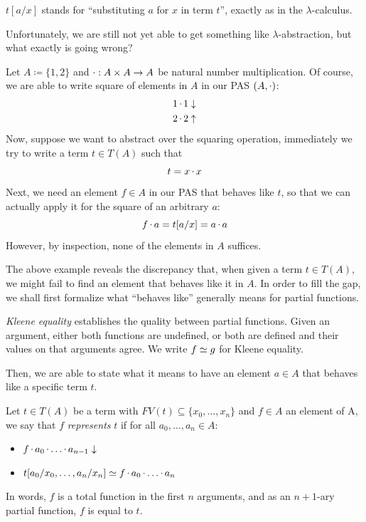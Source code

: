 \begin{notation}
    \(t[a/x]\) stands for ``substituting \(a\) for \(x\) in term \(t\)'', exactly as in the \(\lambda\)-calculus.
\end{notation}

Unfortunately, we are still not yet able to get something like \(\lambda\)-abstraction, but what exactly is going wrong?

\begin{example}
    Let \(A \coloneq \{1, 2\}\) and \(\mathop\cdot\nolimits : A \times A \rightarrow A\) be natural number multiplication.  Of course, we are able to write square of elements in \(A\) in our PAS \((A, \mathop\cdot\nolimits)\):
    \begin{align*}
        1 \mathop\cdot\nolimits 1 \downarrow \\
        2 \mathop\cdot\nolimits 2 \uparrow
    \end{align*}
    Now, suppose we want to abstract over the squaring operation, immediately we try to write a term \(t \in T(A)\) such that
    \[
        t = x \mathop\cdot\nolimits x
    \]
    Next, we need an element \(f \in A\) in our PAS that behaves like \(t\), so that we can actually apply it for the square of an arbitrary \(a\):
    \[
      f \mathop\cdot\nolimits a = t[a/x] = a \mathop\cdot\nolimits a
    \]
    However, by inspection, none of the elements in \(A\) suffices.
    \label{ex:rzrep}
\end{example}

The above example reveals the discrepancy that, when given a term \(t \in T(A)\), we might fail to find an element that behaves like it in \(A\).  In order to fill the gap, we shall first formalize what ``behaves like'' generally means for partial functions.

\begin{definition}
    \emph{Kleene equality} establishes the quality between partial functions.  Given an argument, either both functions are undefined, or both are defined and their values on that arguments agree.  We write \(f \simeq g\) for Kleene equality.
\end{definition}

Then, we are able to state what it means to have an element \(a \in A\) that behaves like a specific term \(t\).

\begin{definition}[Representability]
    Let \(t \in T(A)\) be a term with \(FV(t) \subseteq \{x_0, \ldots, x_n\}\) and \(f \in A\) an element of A, we say that \(f\) \emph{represents} \(t\) if for all \(a_0, \ldots, a_n \in A\):
    \begin{itemize}
        \item \(f \mathop\cdot\nolimits a_0 \mathop\cdot\nolimits \ldots \mathop\cdot\nolimits a_{n-1}\downarrow\)
        \item \(t[a_0/x_0, \ldots, a_n/x_n] \simeq f \mathop\cdot\nolimits a_0 \mathop\cdot\nolimits \ldots \mathop\cdot\nolimits a_n\)
    \end{itemize}
    In words, \(f\) is a total function in the first \(n\) arguments, and as an \(n + 1\)-ary partial function, \(f\) is equal to \(t\).
\end{definition}

